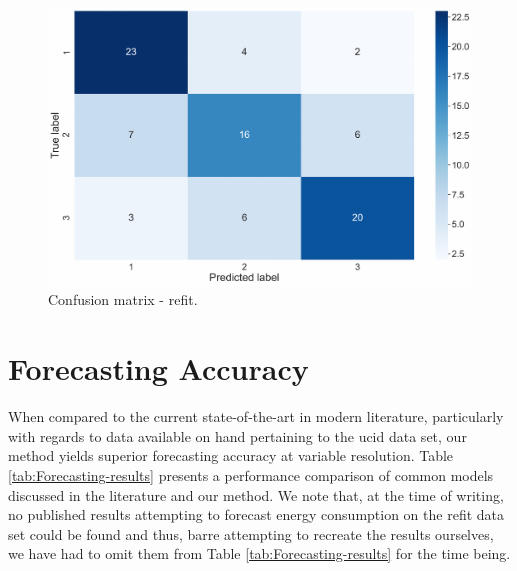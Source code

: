 \begin{figure}[H]
    \centering
    \includegraphics[width=\textwidth]{Images/Chapter 6/REFIT/REFIT-Classification-Confusion-Matrix-1.pdf}
    \caption{Confusion matrix - \gls{refit}.}
    \label{fig:REFIT-Classification-Confusion-Matrix}
\end{figure}


\section{Forecasting Accuracy}
\label{sec:Results-and-Discussion:Forecasting-Accuracy}
When compared to the current state-of-the-art in modern literature, particularly with regards to data available on hand pertaining to the \gls{ucid} data set, our method yields superior forecasting accuracy at variable resolution. Table \ref{tab:Forecasting-results} presents a performance comparison of common models discussed in the literature and our method. We note that, at the time of writing, no published results attempting to forecast energy consumption on the \gls{refit} data set could be found and thus, barre attempting to recreate the results ourselves, we have had to omit them from Table \ref{tab:Forecasting-results} for the time being.

